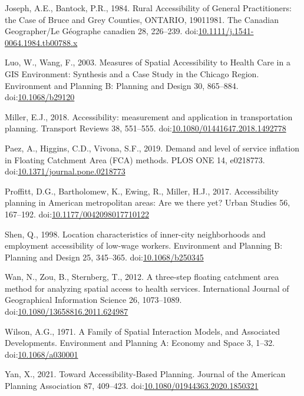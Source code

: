 \documentclass[]{elsarticle} %
\newlength{\cslhangindent}
\newlength{\cslentryspacingunit} %
\newenvironment{CSLReferences}[2] %
 {%
  \setlength{\parindent}{0pt}
  \ifodd #1
  \let\oldpar\par
  \def\par{\hangindent=\cslhangindent\oldpar}
  \fi
  \setlength{\parskip}{#2\cslentryspacingunit}
 }%
 {}
\begin{document}
\begin{CSLReferences}{1}{0}
\leavevmode{}%
Joseph, A.E., Bantock, P.R., 1984. Rural Accessibility of General
Practitioners: the Case of Bruce and Grey Counties, ONTARIO,
1901{\textendash}1981. The Canadian Geographer/Le Géographe canadien 28,
226--239.
doi:\href{https://doi.org/10.1111/j.1541-0064.1984.tb00788.x}{10.1111/j.1541-0064.1984.tb00788.x}

\leavevmode{}%
Luo, W., Wang, F., 2003. Measures of Spatial Accessibility to Health
Care in a GIS Environment: Synthesis and a Case Study in the Chicago
Region. Environment and Planning B: Planning and Design 30, 865--884.
doi:\href{https://doi.org/10.1068/b29120}{10.1068/b29120}

\leavevmode{}%
Miller, E.J., 2018. Accessibility: measurement and application in
transportation planning. Transport Reviews 38, 551--555.
doi:\href{https://doi.org/10.1080/01441647.2018.1492778}{10.1080/01441647.2018.1492778}

\leavevmode{}%
Paez, A., Higgins, C.D., Vivona, S.F., 2019. Demand and level of service
inflation in Floating Catchment Area (FCA) methods. PLOS ONE 14,
e0218773.
doi:\href{https://doi.org/10.1371/journal.pone.0218773}{10.1371/journal.pone.0218773}

\leavevmode{}%
Proffitt, D.G., Bartholomew, K., Ewing, R., Miller, H.J., 2017.
Accessibility planning in American metropolitan areas: Are we there yet?
Urban Studies 56, 167--192.
doi:\href{https://doi.org/10.1177/0042098017710122}{10.1177/0042098017710122}

\leavevmode{}%
Shen, Q., 1998. Location characteristics of inner-city neighborhoods and
employment accessibility of low-wage workers. Environment and Planning
B: Planning and Design 25, 345--365.
doi:\href{https://doi.org/10.1068/b250345}{10.1068/b250345}

\leavevmode{}%
Wan, N., Zou, B., Sternberg, T., 2012. A three-step floating catchment
area method for analyzing spatial access to health services.
International Journal of Geographical Information Science 26,
1073--1089.
doi:\href{https://doi.org/10.1080/13658816.2011.624987}{10.1080/13658816.2011.624987}

\leavevmode{}%
Wilson, A.G., 1971. A Family of Spatial Interaction Models, and
Associated Developments. Environment and Planning A: Economy and Space
3, 1--32. doi:\href{https://doi.org/10.1068/a030001}{10.1068/a030001}

\leavevmode{}%
Yan, X., 2021. Toward Accessibility-Based Planning. Journal of the
American Planning Association 87, 409--423.
doi:\href{https://doi.org/10.1080/01944363.2020.1850321}{10.1080/01944363.2020.1850321}

\end{CSLReferences}
\end{document}
